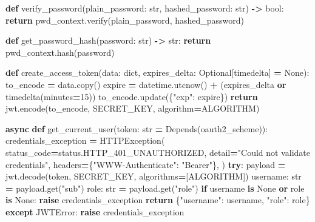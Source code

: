\documentclass[
]{article}
\newenvironment{Shaded}{\begin{snugshade}}{\end{snugshade}}
\newcommand{\BuiltInTok}[1]{#1}
\newcommand{\ControlFlowTok}[1]{\textcolor[rgb]{0.13,0.29,0.53}{\textbf{#1}}}
\newcommand{\DecValTok}[1]{\textcolor[rgb]{0.00,0.00,0.81}{#1}}
\newcommand{\KeywordTok}[1]{\textcolor[rgb]{0.13,0.29,0.53}{\textbf{#1}}}
\newcommand{\NormalTok}[1]{#1}
\newcommand{\OperatorTok}[1]{\textcolor[rgb]{0.81,0.36,0.00}{\textbf{#1}}}
\newcommand{\StringTok}[1]{\textcolor[rgb]{0.31,0.60,0.02}{#1}}
\newcommand{\VariableTok}[1]{\textcolor[rgb]{0.00,0.00,0.00}{#1}}
\begin{document}
\begin{Shaded}
\begin{Highlighting}[]
\KeywordTok{def}\NormalTok{ verify\_password(plain\_password: }\BuiltInTok{str}\NormalTok{, hashed\_password: }\BuiltInTok{str}\NormalTok{) }\OperatorTok{{-}\textgreater{}} \BuiltInTok{bool}\NormalTok{:}
    \ControlFlowTok{return}\NormalTok{ pwd\_context.verify(plain\_password, hashed\_password)}

\KeywordTok{def}\NormalTok{ get\_password\_hash(password: }\BuiltInTok{str}\NormalTok{) }\OperatorTok{{-}\textgreater{}} \BuiltInTok{str}\NormalTok{:}
    \ControlFlowTok{return}\NormalTok{ pwd\_context.}\BuiltInTok{hash}\NormalTok{(password)}

\KeywordTok{def}\NormalTok{ create\_access\_token(data: }\BuiltInTok{dict}\NormalTok{, expires\_delta: Optional[timedelta] }\OperatorTok{=} \VariableTok{None}\NormalTok{):}
\NormalTok{    to\_encode }\OperatorTok{=}\NormalTok{ data.copy()}
\NormalTok{    expire }\OperatorTok{=}\NormalTok{ datetime.utcnow() }\OperatorTok{+}\NormalTok{ (expires\_delta }\KeywordTok{or}\NormalTok{ timedelta(minutes}\OperatorTok{=}\DecValTok{15}\NormalTok{))}
\NormalTok{    to\_encode.update(\{}\StringTok{"exp"}\NormalTok{: expire\})}
    \ControlFlowTok{return}\NormalTok{ jwt.encode(to\_encode, SECRET\_KEY, algorithm}\OperatorTok{=}\NormalTok{ALGORITHM)}

\ControlFlowTok{async} \KeywordTok{def}\NormalTok{ get\_current\_user(token: }\BuiltInTok{str} \OperatorTok{=}\NormalTok{ Depends(oauth2\_scheme)):}
\NormalTok{    credentials\_exception }\OperatorTok{=}\NormalTok{ HTTPException(}
\NormalTok{        status\_code}\OperatorTok{=}\NormalTok{status.HTTP\_401\_UNAUTHORIZED,}
\NormalTok{        detail}\OperatorTok{=}\StringTok{"Could not validate credentials"}\NormalTok{,}
\NormalTok{        headers}\OperatorTok{=}\NormalTok{\{}\StringTok{"WWW{-}Authenticate"}\NormalTok{: }\StringTok{"Bearer"}\NormalTok{\},}
\NormalTok{    )}
    \ControlFlowTok{try}\NormalTok{:}
\NormalTok{        payload }\OperatorTok{=}\NormalTok{ jwt.decode(token, SECRET\_KEY, algorithms}\OperatorTok{=}\NormalTok{[ALGORITHM])}
\NormalTok{        username: }\BuiltInTok{str} \OperatorTok{=}\NormalTok{ payload.get(}\StringTok{"sub"}\NormalTok{)}
\NormalTok{        role: }\BuiltInTok{str} \OperatorTok{=}\NormalTok{ payload.get(}\StringTok{"role"}\NormalTok{)}
        \ControlFlowTok{if}\NormalTok{ username }\KeywordTok{is} \VariableTok{None} \KeywordTok{or}\NormalTok{ role }\KeywordTok{is} \VariableTok{None}\NormalTok{:}
            \ControlFlowTok{raise}\NormalTok{ credentials\_exception}
        \ControlFlowTok{return}\NormalTok{ \{}\StringTok{"username"}\NormalTok{: username, }\StringTok{"role"}\NormalTok{: role\}}
    \ControlFlowTok{except}\NormalTok{ JWTError:}
        \ControlFlowTok{raise}\NormalTok{ credentials\_exception}


\end{Highlighting}
\end{Shaded}
\end{document}
